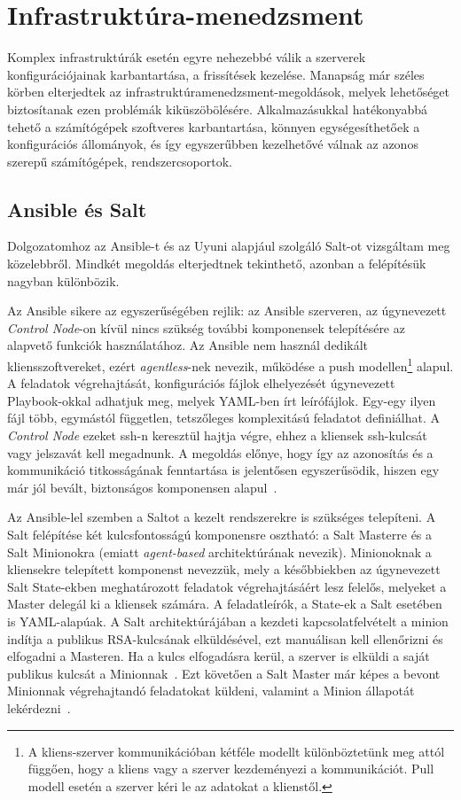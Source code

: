 \section{Infrastruktúra-menedzsment}
Komplex infrastruktúrák esetén egyre nehezebbé válik a szerverek konfigurációjainak karbantartása, a frissítések kezelése. Manapság már széles körben elterjedtek az infrastruktúramenedzsment-megoldások, melyek lehetőséget biztosítanak ezen problémák kiküszöbölésére. Alkalmazásukkal hatékonyabbá tehető a számítógépek szoftveres karbantartása, könnyen egységesíthetőek a konfigurációs állományok, és így egyszerűbben kezelhetővé válnak az azonos szerepű számítógépek, rendszercsoportok.

\subsection{Ansible és Salt}
Dolgozatomhoz az Ansible-t és az Uyuni alapjául szolgáló Salt-ot vizsgáltam meg közelebbről. Mindkét megoldás elterjedtnek tekinthető, azonban a felépítésük nagyban különbözik.

Az Ansible sikere az egyszerűségében rejlik: az Ansible szerveren, az úgynevezett \textit{Control Node}-on kívül nincs szükség további komponensek telepítésére az alapvető funkciók használatához. Az Ansible nem használ dedikált kliensszoftvereket, ezért \textit{agentless}-nek nevezik, működése a push modellen\footnote{A kliens-szerver kommunikációban kétféle modellt különböztetünk meg attól függően, hogy a kliens vagy a szerver kezdeményezi a kommunikációt. Pull modell esetén a szerver kéri le az adatokat a klienstől.} alapul. A feladatok végrehajtását, konfigurációs fájlok elhelyezését úgynevezett Playbook-okkal adhatjuk meg, melyek YAML-ben írt leírófájlok. Egy-egy ilyen fájl több, egymástól független, tetszőleges komplexitású feladatot definiálhat. A \textit{Control Node} ezeket \acrshort{ssh}-n keresztül hajtja végre, ehhez a kliensek \acrshort{ssh}-kulcsát vagy jelszavát kell megadnunk. A megoldás előnye, hogy így az azonosítás és a kommunikáció titkosságának fenntartása is jelentősen egyszerűsödik, hiszen egy már jól bevált, biztonságos komponensen alapul~\cite{RedHatAnsibleVsSalt}.

Az Ansible-lel szemben a Saltot a kezelt rendszerekre is szükséges telepíteni. A Salt felépítése két kulcsfontosságú komponensre osztható: a Salt Masterre és a Salt Minionokra (emiatt \textit{agent-based} architektúrának nevezik). Minionoknak a kliensekre telepített komponenst nevezzük, mely a későbbiekben az úgynevezett Salt State-ekben meghatározott feladatok végrehajtásáért lesz felelős, melyeket a Master delegál ki a kliensek számára. A feladatleírók, a State-ek a Salt esetében is YAML-alapúak. A Salt architektúrájában a kezdeti kapcsolatfelvételt a minion indítja a publikus RSA-kulcsának elküldésével, ezt manuálisan kell ellenőrizni és elfogadni a Masteren. Ha a kulcs elfogadásra kerül, a szerver is elküldi a saját publikus kulcsát a Minionnak~\cite{SaltSecurity}. Ezt követően a Salt Master már képes a bevont Minionnak végrehajtandó feladatokat küldeni, valamint a Minion állapotát lekérdezni~\cite{RedHatAnsibleVsSalt}.

